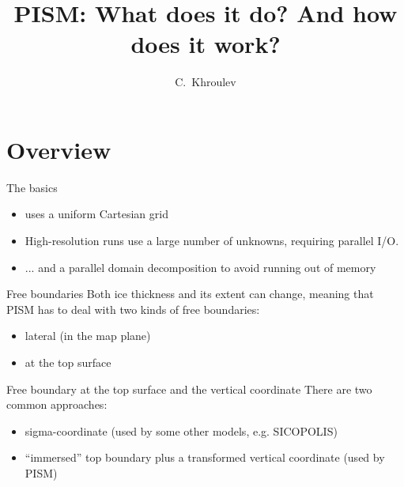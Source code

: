 \documentclass[notes,intlimits]{beamer}
\title{PISM: What does it do? And how does it work?}
\author{C.~Khroulev}
\date{}
\begin{document}
\begin{frame}
  \titlepage
\end{frame}


\section{Overview}
\label{sec:overview}

\begin{frame}{The basics}
  \begin{itemize}
  \item uses a uniform Cartesian grid
  \item High-resolution runs use a large number of unknowns, requiring
    parallel I/O.
  \item ... and a parallel domain decomposition to avoid running out
    of memory
  \end{itemize}
\end{frame}


\begin{frame}{Free boundaries}
  Both ice thickness and its extent can change, meaning that PISM has
  to deal with two kinds of free boundaries:

  \begin{itemize}
  \item lateral (in the map plane)
  \item at the top surface
  \end{itemize}
\end{frame}


\begin{frame}{Free boundary at the top surface and the vertical coordinate}
  There are two common approaches:
  \begin{itemize}
  \item sigma-coordinate (used by some other models, e.g. SICOPOLIS)
  \item ``immersed'' top boundary plus a transformed
    vertical coordinate (used by PISM)
  \end{itemize}
\end{frame}
\end{document}
